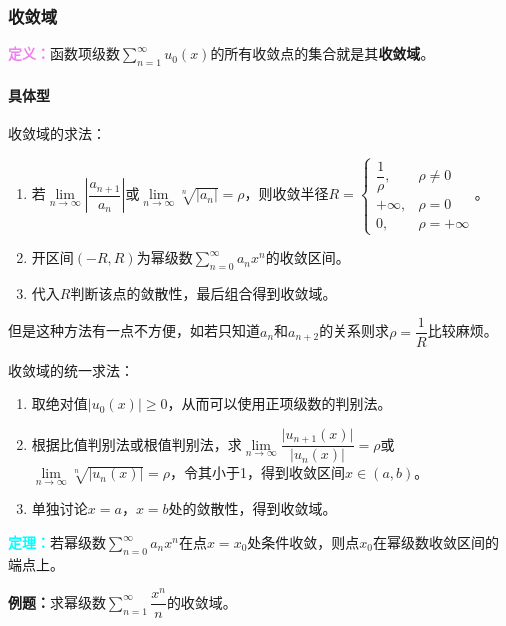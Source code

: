 \subsubsection{收敛域}

\textcolor{violet}{\textbf{定义：}}函数项级数$\sum\limits_{n=1}^\infty u_0(x)$的所有收敛点的集合就是其\textbf{收敛域}。

\paragraph{具体型} \leavevmode \medskip

收敛域的求法：

\begin{enumerate}
    \item 若$\lim\limits_{n\to\infty}\left\vert\dfrac{a_{n+1}}{a_n}\right\vert$或$\lim\limits_{n\to\infty}\sqrt[n]{\vert a_n\vert}=\rho$，则收敛半径$R=\left\{\begin{array}{ll}
        \dfrac{1}{\rho}, & \rho\neq0 \\
        +\infty, & \rho=0 \\
        0, & \rho=+\infty
    \end{array}\right.$。
    \item 开区间$(-R,R)$为幂级数$\sum\limits_{n=0}^\infty a_nx^n$的收敛区间。
    \item 代入$R$判断该点的敛散性，最后组合得到收敛域。
\end{enumerate}

但是这种方法有一点不方便，如若只知道$a_n$和$a_{n+2}$的关系则求$\rho=\dfrac{1}{R}$比较麻烦。

收敛域的统一求法：

\begin{enumerate}
    \item 取绝对值$\vert u_0(x)\vert\geqslant0$，从而可以使用正项级数的判别法。
    \item 根据比值判别法或根值判别法，求$\lim\limits_{n\to\infty}\dfrac{\vert u_{n+1}(x)\vert}{\vert u_n(x)\vert}=\rho$或$\lim\limits_{n\to\infty}\sqrt[n]{\vert u_n(x)\vert}=\rho$，令其小于1，得到收敛区间$x\in(a,b)$。
    \item 单独讨论$x=a$，$x=b$处的敛散性，得到收敛域。
\end{enumerate}

\textcolor{aqua}{\textbf{定理：}}若幂级数$\sum\limits_{n=0}^\infty a_nx^n$在点$x=x_0$处条件收敛，则点$x_0$在幂级数收敛区间的端点上。

\textbf{例题：}求幂级数$\sum\limits_{n=1}^\infty\dfrac{x^n}{n}$的收敛域。

